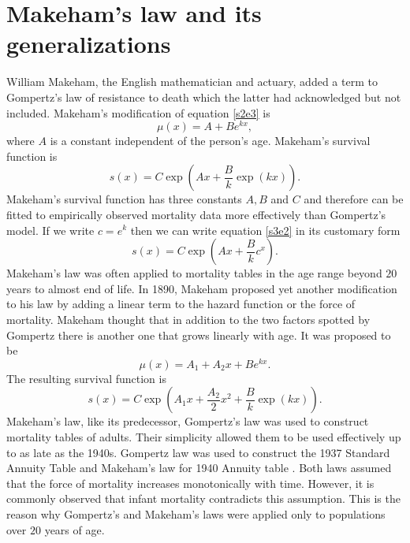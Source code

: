 \documentclass{article}
\numberwithin{equation}{section}
\begin{document}
\section{Makeham's law and its generalizations}\label{s3}
William Makeham, the English mathematician and actuary, added a term to
Gompertz's law of resistance to death which the latter had acknowledged but
not included. Makeham's modification \cite{makeham1867law} of equation 
\eqref{s2e3} is
\begin{equation}\label{s3e1}
\mu(x) = A + Be^{kx},
\end{equation}
where $A$ is a constant independent of the person's age. Makeham's survival
function is
\begin{equation}\label{s3e2}
s(x) = C\exp\left(Ax + \frac{B}{k}\exp(kx)\right).
\end{equation}
Makeham's survival function has three constants $A, B$ and $C$ and therefore
can be fitted to empirically observed mortality data more effectively than
Gompertz's model. If we write $c = e^k$ then we can write equation \eqref{s3e2}
in its customary form
\[
s(x) = C\exp\left(Ax + \frac{B}{k}c^x\right).
\]
Makeham's law was often applied to mortality tables in the
age range beyond $20$ years to almost end of life\cite{jordan1967society}. 
In 1890\cite{makeham1890further}, Makeham proposed yet another modification to 
his law by adding a linear term to the hazard function or the force of 
mortality. Makeham thought that in addition to the two factors spotted by
Gompertz there is another one that grows linearly with age. It was proposed to 
be
\begin{equation}\label{s3e3}
\mu(x) = A_1 + A_2x + Be^{kx}.
\end{equation}
The resulting survival function is
\begin{equation}\label{s3e4}
s(x) = C\exp\left(A_1x + \frac{A_2}{2}x^2 + \frac{B}{k}\exp(kx)\right).
\end{equation}
Makeham's law, like its predecessor, Gompertz's law was used to construct
mortality tables of adults. Their simplicity allowed them to be used 
effectively up to as late as the 1940s. Gompertz law was used to construct
the 1937 Standard Annuity Table and Makeham's law for 1940 Annuity table
\cite{jordan1967society}. Both laws assumed that the force of mortality 
increases monotonically with time. However, it is commonly observed that 
infant mortality contradicts this assumption. This is the reason why Gompertz's
and Makeham's laws were applied only to populations over $20$ years of age. 
\end{document}
